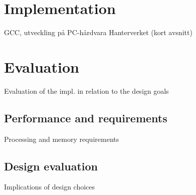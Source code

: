 \documentclass[final,letterpaper,twoside,12pt,twocolumn]{report}
\begin{document}
\chapter{Implementation}
GCC, utveckling på PC-hårdvara
Hanterverket
(kort avsnitt)


\chapter{Evaluation}
Evaluation of the impl. in relation to the design goals


\section{Performance and requirements}
Processing and memory requirements

\section{Design evaluation}
Implications of design choices
\end{document}

